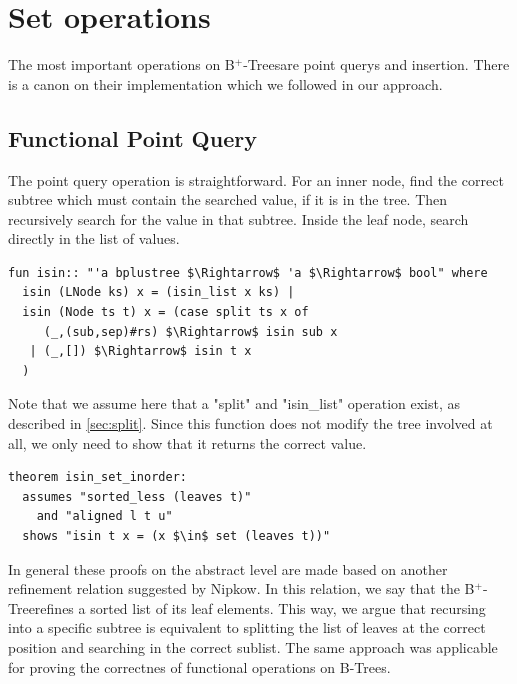 \documentclass[a4paper,UKenglish,cleveref, autoref, thm-restate]{lipics-v2021}
\newcommand{\btree}{B$^+$-Tree}
\newcommand{\btrees}{B$^+$-Trees}
\begin{document}
\section{Set operations}
\label{sec:set}

The most important operations on \btrees are point querys and insertion.
There is a canon on their implementation which we followed in our approach.

\subsection{Functional Point Query}
\label{sec:functional_pq}

The point query operation is straightforward.
For an inner node, find the correct subtree which must contain
the searched value, if it is in the tree.
Then recursively search for the value in that subtree.
Inside the leaf node, search directly in the list of values.

\begin{lstlisting}[mathescape=true, language=Isabelle,label=lst:isin-def]
fun isin:: "'a bplustree $\Rightarrow$ 'a $\Rightarrow$ bool" where
  isin (LNode ks) x = (isin_list x ks) |
  isin (Node ts t) x = (case split ts x of
     (_,(sub,sep)#rs) $\Rightarrow$ isin sub x
   | (_,[]) $\Rightarrow$ isin t x
  )
\end{lstlisting}

Note that we assume here that a "split" and "isin\_list" operation exist,
as described in \autoref{sec:split}.
Since this function does not modify the tree involved at all,
we only need to show that it returns the correct value.


\begin{lstlisting}[mathescape=true, language=Isabelle,label=lst:isin-set-inorder]
theorem isin_set_inorder:
  assumes "sorted_less (leaves t)"
    and "aligned l t u"
  shows "isin t x = (x $\in$ set (leaves t))"
\end{lstlisting}

In general these proofs on the abstract level are made
based on another refinement relation suggested by Nipkow. \cite{DBLP:conf/itp/Nipkow16}
In this relation, we say that the \btree refines a sorted list of its leaf elements.
This way, we argue that recursing into a specific subtree
is equivalent to splitting the list of leaves at the correct position
and searching in the correct sublist.
The same approach was applicable for proving the correctnes of functional
operations on B-Trees. \cite{DBLP:journals/afp/Mundler21}
\end{document}
